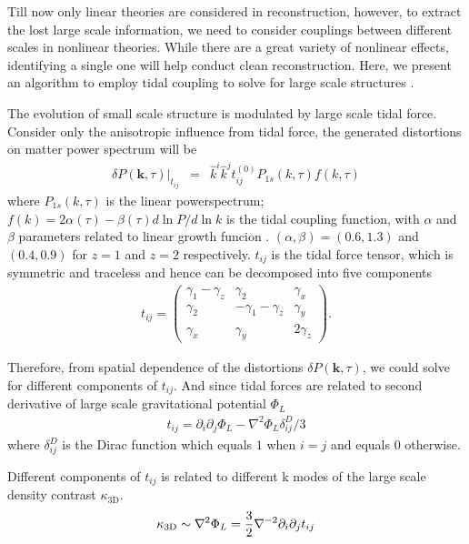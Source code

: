 Till now only linear theories are considered in reconstruction, 
however, to extract the lost large scale information, 
we need to consider couplings between different scales in nonlinear theories. 
While there are a great variety of nonlinear effects, 
identifying a single one will help conduct clean reconstruction.   
Here, we present an algorithm to employ 
tidal coupling 
to solve for large scale structures 
\cite{2015:zhu,2012:pen}.  

The evolution of small scale structure is modulated by large scale 
tidal force. 
Consider only the anisotropic influence from tidal force, 
the generated distortions on matter power spectrum will be 
\begin{eqnarray}
\label{eq:powerdistort}
\delta P(\bm{k},\tau)|_{t_{ij}}&=&
\hat{k}^i\hat{k}^jt_{ij}^{(0)}P_{1s}(k,\tau)f(k,\tau)
\end{eqnarray}
where $P_{1s}(k,\tau)$ is the linear powerspectrum; 
$f(k)=2\alpha(\tau)-\beta(\tau)d\ln P/d\ln k$ is the tidal coupling function, 
with $\alpha$ and $\beta$ parameters related to linear growth funcion \cite{2015:zhu}. 
$(\alpha,\beta)=(0.6,1.3)$ and $(0.4, 0.9)$ for $z=1$ and $z=2$ respectively. 
$t_{ij}$ is the tidal force tensor, 
which is symmetric and traceless 
and hence can be decomposed into five components 
\begin{eqnarray}
t_{ij}=\left( \begin{array}{ccc}
\gamma_{1}-\gamma_{z} & \gamma_{2} & \gamma_{x}\\
\gamma_{2} & -\gamma_{1}-\gamma_{z} & \gamma_{y}\\
\gamma_{x} & \gamma_{y} & 2\gamma_z
\end{array} \right).
\end{eqnarray}

Therefore, from spatial dependence of the distortions 
$\delta P(\bm{k},\tau)$, 
we could solve for different components of $t_{ij}$. 
And since tidal forces are related to second derivative 
of large scale gravitational potential $\Phi_L$ 
\begin{eqnarray}
\label{eq:tij}
t_{ij}=\partial_i\partial_j\Phi_{L}-\nabla^2\Phi_L\delta^D_{ij}/3
\end{eqnarray}
where $\delta_{ij}^D$ is the Dirac function 
which equals $1$ when $i=j$ and equals $0$ otherwise.

Different components of $t_{ij}$ is related to 
different k modes of the large scale 
density contrast $\kappa_\mathrm{3D}$.
\begin{eqnarray}
    \label{eq:largepoten}
    \kappa_\mathrm{3D}\sim\nabla^2\Phi_L=\frac{3}{2}\nabla^{-2}\partial_i\partial_j t_{ij}
\end{eqnarray}

